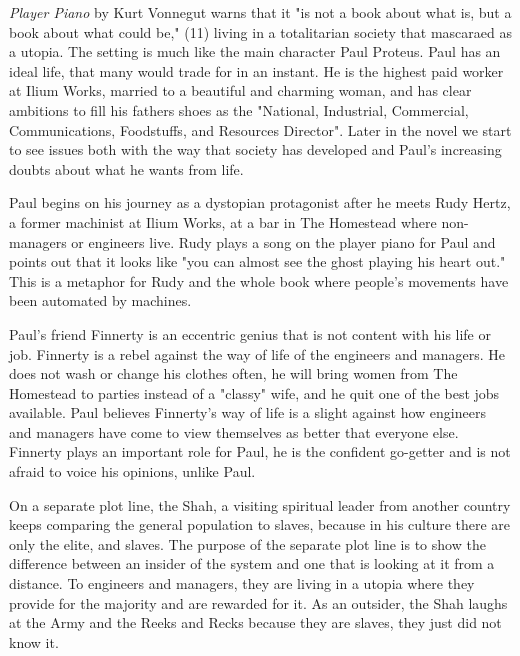 {\it Player Piano} by Kurt Vonnegut warns that it "is not a book about what is, but a book about what could be," \cite{Kurt}(11) living in a totalitarian society that mascaraed as a utopia.
The setting is much like the main character Paul Proteus.
Paul has an ideal life, that many would trade for in an instant.
He is the highest paid worker at Ilium Works, married to a beautiful and charming woman, and has clear ambitions to fill his fathers shoes as the "National, Industrial, Commercial, Communications, Foodstuffs, and Resources Director".
Later in the novel we start to see issues both with the way that society has developed and Paul's increasing doubts about what he wants from life.

Paul begins on his journey as a dystopian protagonist after he meets Rudy Hertz, a former machinist at Ilium Works, at a bar in The Homestead where non-managers or engineers live.
Rudy plays a song on the player piano for Paul and points out that it looks like "you can almost see the ghost playing his heart out."
This is a metaphor for Rudy and the whole book where people's movements have been automated by machines. 

Paul's friend Finnerty is an eccentric genius that is not content with his life or job.
Finnerty is a rebel against the way of life of the engineers and managers.
He does not wash or change his clothes often, he will bring women from The Homestead to parties instead of a "classy" wife, and he quit one of the best jobs available.
Paul believes Finnerty's way of life is a slight against how engineers and managers have come to view themselves as better that everyone else.
Finnerty plays an important role for Paul, he is the confident go-getter and is not afraid to voice his opinions, unlike Paul.

On a separate plot line, the Shah, a visiting spiritual leader from another country keeps comparing the general population to slaves, because in his culture there are only the elite, and slaves.
The purpose of the separate plot line is to show the difference between an insider of the system and one that is looking at it from a distance.
To engineers and managers, they are living in a utopia where they provide for the majority and are rewarded for it.
As an outsider, the Shah laughs at the Army and the Reeks and Recks because they are slaves, they just did not know it.